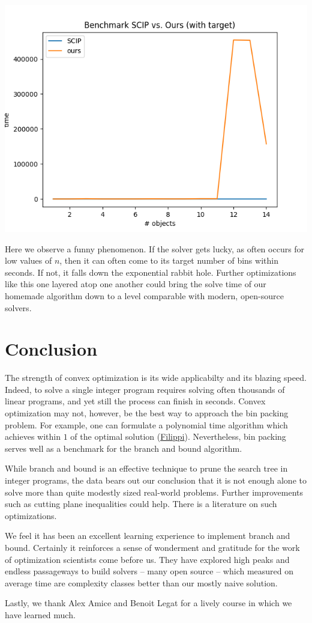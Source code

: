 \documentclass{article}
\begin{document}
\begin{center}
    \includegraphics[scale=0.5]{benchmark_yes_target}
\end{center}

Here we observe a funny phenomenon. If the solver gets lucky, as often occurs for low values of $n$, then it can often come to its target number of bins within seconds. If not, it falls down the exponential rabbit hole. Further optimizations like this one layered atop one another could bring the solve time of our homemade algorithm down to a level comparable with modern, open-source solvers.

\section*{Conclusion}

The strength of convex optimization is its wide applicabilty and its blazing speed. Indeed, to solve a single integer program requires solving often thousands of linear programs, and yet still the process can finish in seconds. Convex optimization may not, however, be the best way to approach the bin packing problem. For example, one can formulate a polynomial time algorithm which achieves within $1$ of the optimal solution (\href{sciencedirect.com/science/article/abs/pii/S0377221706004310?via\%3Dihub}{Filippi}). Nevertheless, bin packing serves well as a benchmark for the branch and bound algorithm.

While branch and bound is an effective technique to prune the search tree in integer programs, the data bears out our conclusion that it is not enough alone to solve more than quite modestly sized real-world problems. Further improvements such as cutting plane inequalities could help. There is a literature on such optimizations.

We feel it has been an excellent learning experience to implement branch and bound. Certainly it reinforces a sense of wonderment and gratitude for the work of optimization scientists come before us. They have explored high peaks and endless passageways to build solvers -- many open source -- which measured on average time are complexity classes better than our mostly naive solution.

Lastly, we thank Alex Amice and Benoit Legat for a lively course in which we have learned much.
\end{document}
